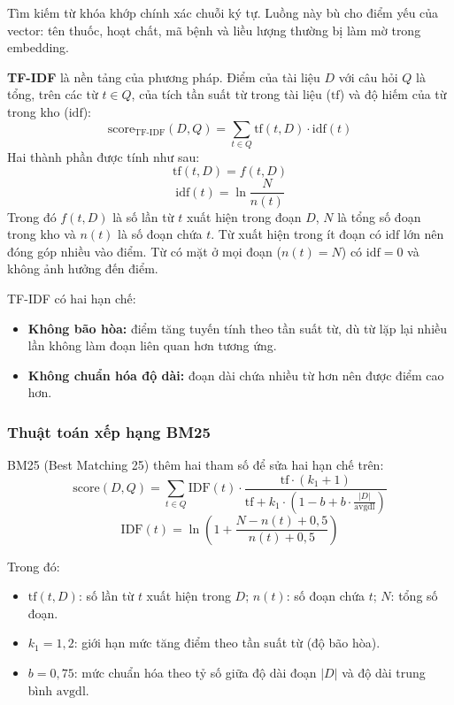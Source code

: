 Tìm kiếm từ khóa khớp chính xác chuỗi ký tự. Luồng này bù cho điểm yếu của vector: tên thuốc, hoạt chất, mã bệnh và liều lượng thường bị làm mờ trong embedding.

\textbf{TF-IDF} là nền tảng của phương pháp. Điểm của tài liệu $D$ với câu hỏi $Q$ là tổng, trên các từ $t\in Q$, của tích tần suất từ trong tài liệu ($\mathrm{tf}$) và độ hiếm của từ trong kho ($\mathrm{idf}$):
\begin{equation}
  \mathrm{score}_{\mathrm{TF\text{-}IDF}}(D,Q)=\sum _{t\in Q} \mathrm{tf}(t,D)\cdot \mathrm{idf}(t)
\end{equation}
Hai thành phần được tính như sau:
\begin{equation}
  \mathrm{tf}(t,D)=f(t,D)
\end{equation}
\begin{equation}
  \mathrm{idf}(t)=\ln\frac{N}{n(t)}
\end{equation}
Trong đó $f(t,D)$ là số lần từ $t$ xuất hiện trong đoạn $D$, $N$ là tổng số đoạn trong kho và $n(t)$ là số đoạn chứa $t$. Từ xuất hiện trong ít đoạn có $\mathrm{idf}$ lớn nên đóng góp nhiều vào điểm. Từ có mặt ở mọi đoạn ($n(t)=N$) có $\mathrm{idf}=0$ và không ảnh hưởng đến điểm.

TF-IDF có hai hạn chế:
\begin{itemize}
  \item \textbf{Không bão hòa:} điểm tăng tuyến tính theo tần suất từ, dù từ lặp lại nhiều lần không làm đoạn liên quan hơn tương ứng.
  \item \textbf{Không chuẩn hóa độ dài:} đoạn dài chứa nhiều từ hơn nên được điểm cao hơn.
\end{itemize}

\subsubsection{Thuật toán xếp hạng BM25}

BM25 (Best Matching 25) thêm hai tham số để sửa hai hạn chế trên:
\begin{equation}
  \mathrm{score}(D,Q)=\sum_{t\in Q}\mathrm{IDF}(t)\cdot\frac{\mathrm{tf}\cdot(k_1+1)}{\mathrm{tf}+k_1\cdot\left(1-b+b\cdot\frac{|D|}{\mathrm{avgdl}}\right)}
\end{equation}
\begin{equation}
  \mathrm{IDF}(t)=\ln\left( 1+\frac{N-n(t)+0{,}5}{n(t)+0{,}5}\right)
\end{equation}

Trong đó:
\begin{itemize}
  \item $\mathrm{tf}(t,D)$: số lần từ $t$ xuất hiện trong $D$; $n(t)$: số đoạn chứa $t$; $N$: tổng số đoạn.
  \item $k_1=1{,}2$: giới hạn mức tăng điểm theo tần suất từ (độ bão hòa).
  \item $b=0{,}75$: mức chuẩn hóa theo tỷ số giữa độ dài đoạn $|D|$ và độ dài trung bình $\mathrm{avgdl}$.
\end{itemize}

